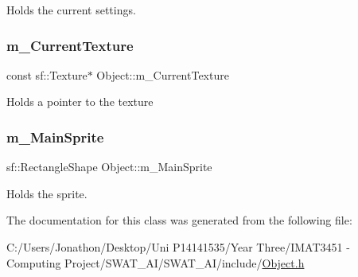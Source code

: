 Holds the current settings. 

\mbox{\label{class_object_a27be0a7890a5229f7e4770032e92f4ba}} 
\subsubsection{\texorpdfstring{m\+\_\+\+Current\+Texture}{m\_CurrentTexture}}
{\footnotesize\ttfamily const sf\+::\+Texture$\ast$ Object\+::m\+\_\+\+Current\+Texture\hspace{0.3cm}{\ttfamily [protected]}}

Holds a pointer to the texture \mbox{\label{class_object_aa985332e74ddde62b618253570812de6}} 
\subsubsection{\texorpdfstring{m\+\_\+\+Main\+Sprite}{m\_MainSprite}}
{\footnotesize\ttfamily sf\+::\+Rectangle\+Shape Object\+::m\+\_\+\+Main\+Sprite\hspace{0.3cm}{\ttfamily [protected]}}



Holds the sprite. 



The documentation for this class was generated from the following file\+:\begin{DoxyCompactItemize}
\item 
C\+:/\+Users/\+Jonathon/\+Desktop/\+Uni P14141535/\+Year Three/\+I\+M\+A\+T3451 -\/ Computing Project/\+S\+W\+A\+T\+\_\+\+A\+I/\+S\+W\+A\+T\+\_\+\+A\+I/include/\hyperlink{_object_8h}{Object.\+h}\end{DoxyCompactItemize}
